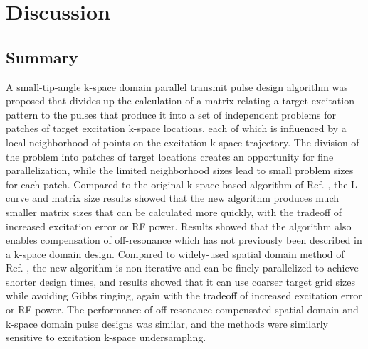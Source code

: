 \section*{Discussion}
\subsection*{Summary}
A small-tip-angle k-space domain parallel transmit pulse design algorithm was proposed
that divides up the calculation of a matrix relating a target excitation pattern to the pulses that produce it 
into a set of independent problems for patches of target excitation k-space locations,
each of which is influenced by a local neighborhood of points on the excitation k-space trajectory.
The division of the problem into patches of target locations creates an opportunity for fine parallelization,
while the limited neighborhood sizes lead to small problem sizes for each patch. 
Compared to the original k-space-based algorithm of Ref. \cite{Katscher:2003:Magn-Reson-Med:12509830},
the L-curve and matrix size results showed that 
the new algorithm produces much smaller matrix sizes that can be calculated more quickly,
with the tradeoff of increased excitation error or RF power. 
Results showed that the algorithm also enables compensation of off-resonance 
which has not previously been described in a k-space domain design. 
Compared to widely-used spatial domain method of Ref. \cite{Grissom:2006:MRM},
the new algorithm is non-iterative and can be finely parallelized to achieve shorter design times, 
and results showed that it can use coarser target grid sizes while avoiding Gibbs ringing, 
again with the tradeoff of increased excitation error or RF power.
The performance of off-resonance-compensated spatial domain and k-space domain pulse designs was similar,
and the methods were similarly sensitive to excitation k-space undersampling. 

